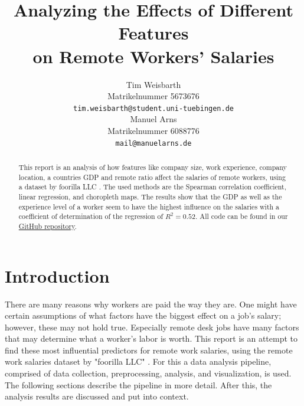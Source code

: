 \documentclass{article}
\title{Analyzing the Effects of Different Features\\ on Remote Workers' Salaries}
\author{%
  Tim Weisbarth\\
  Matrikelnummer 5673676 \\
  \texttt{tim.weisbarth@student.uni-tuebingen.de} \\
  \And
  Manuel Arns\\
  Matrikelnummer 6088776\\
  \texttt{mail@manuelarns.de} \\
}
\begin{document}
\maketitle

\begin{abstract}

    This report is an analysis of how features like company size, work experience, company location, a countries GDP and remote ratio affect the salaries of remote workers, using a dataset by foorilla LLC \cite{datasets2022}. The used methods are the Spearman correlation coefficient, linear regression, and choropleth maps. The results show that the GDP as well as the experience level of a worker seem to have the highest influence on the salaries with a coefficient of determination of the regression of $R^2=0.52$. All code can be found in our \href{https://github.com/manuelarns/Data-Literacy-Project}{GitHub repository}.
    
\end{abstract}

\section{Introduction}
There are many reasons why workers are paid the way they are. One might have certain assumptions of what factors have the biggest effect on a job's salary; however, these may not hold true. Especially remote desk jobs have many factors that may determine what a worker's labor is worth. This report is an attempt to find these most influential predictors for remote work salaries, using the remote work salaries dataset by "foorilla LLC" \cite{datasets2022}. For this a data analysis pipeline, comprised of data collection, preprocessing, analysis, and visualization, is used. The following sections describe the pipeline in more detail. After this, the analysis results are discussed and put into context.
\end{document}
